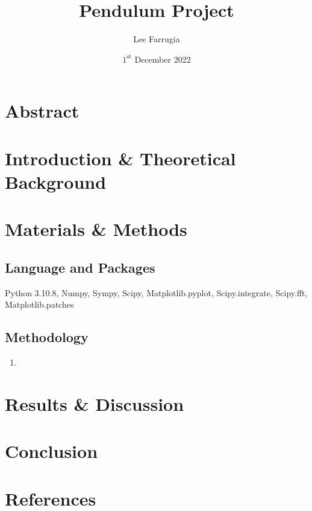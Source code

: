 \documentclass[12pt, a4paper]{article}
\title{Pendulum Project}
\date{\(1^\mathrm{{st}}\) December 2022}
\author{Lee Farrugia}
\begin{document}
    
\maketitle
\thispagestyle{titlepagestyle}
\pagestyle{mystyle}

\section{Abstract}

\section{Introduction \& Theoretical Background}

\section{Materials \& Methods}
\subsection{Language and Packages}
Python 3.10.8, Numpy, Sympy, Scipy, Matplotlib.pyplot, Scipy.integrate, Scipy.fft, Matplotlib.patches
\subsection{Methodology}
\begin{enumerate}
    \item 
\end{enumerate}

\section{Results \& Discussion}

\section{Conclusion}

\section{References}
\printbibliography[heading = none]
\end{document}
